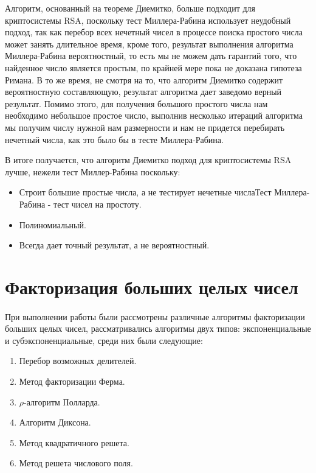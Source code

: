 	Алгоритм, основанный на теореме Диемитко, больше подходит для криптосистемы RSA, поскольку тест Миллера-Рабина использует неудобный подход, так как 
	перебор всех нечетный чисел в процессе поиска простого числа может занять длительное время, кроме того, результат выполнения алгоритма Миллера-Рабина вероятностный, то есть мы не можем дать гарантий того, что найденное число является простым, по крайней мере пока не доказана гипотеза Римана. В то же время, не смотря на то, что алгоритм Диемитко содержит вероятностную составляющую, результат алгоритма дает заведомо верный результат. Помимо этого, для получения большого простого числа нам необходимо небольшое простое число, выполнив несколько итераций алгоритма мы получим числу нужной нам размерности и нам не придется перебирать нечетный числа, как это было бы в тесте Миллера-Рабина.

	В итоге получается, что алгоритм Диемитко подход для криптосистемы RSA лучше, нежели тест Миллер-Рабина поскольку:
		\begin{itemize}
			\item Строит большие простые числа, а не тестирует нечетные числаТест Миллера-Рабина - тест чисел на простоту.
			\item Полиномиальный.
			\item Всегда дает точный результат, а не вероятностный.
		\end{itemize}

\section*{Факторизация больших целых чисел}

	\paragraph{} При выполнении работы были рассмотрены различные алгоритмы факторизации больших целых чисел, рассматривались алгоритмы двух типов: 
	экспоненциальные и субэкспоненциальные, среди них были следующие:
		\begin{enumerate}
			\item Перебор возможных делителей.
			\item Метод факторизации Ферма.
			\item {$\rho$}-алгоритм Полларда.
			\item Алгоритм Диксона.
			\item Метод квадратичного решета.
			\item Метод решета числового поля.
		\end{enumerate}

